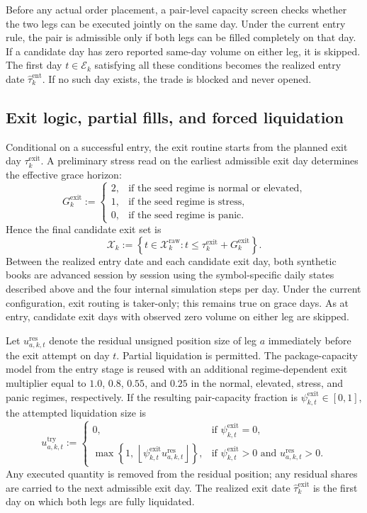\documentclass[11pt,a4paper]{article}
\begin{document}
Before any actual order placement, a pair-level capacity screen checks whether
the two legs can be executed jointly on the same day. Under the current entry
rule, the pair is admissible only if both legs can be filled completely on that
day. If a candidate day has zero reported same-day volume on either leg, it is
skipped. The first day \(t\in\mathcal E_k\) satisfying all these conditions
becomes the realized entry date \(\widehat\tau_k^{\mathrm{ent}}\). If no such
day exists, the trade is blocked and never opened.

\subsection{Exit logic, partial fills, and forced liquidation}

Conditional on a successful entry, the exit routine starts from the planned exit
day \(\tau_k^{\mathrm{exit}}\). A preliminary stress read on the earliest
admissible exit day determines the effective grace horizon:
\[
  G_k^{\mathrm{exit}}
  :=
  \begin{cases}
    2, & \text{if the seed regime is normal or elevated},\\
    1, & \text{if the seed regime is stress},\\
    0, & \text{if the seed regime is panic}.
  \end{cases}
\]
Hence the final candidate exit set is
\[
  \mathcal X_k
  :=
  \left\{
    t\in\mathcal X_k^{\mathrm{raw}}:
    t\le \tau_k^{\mathrm{exit}} + G_k^{\mathrm{exit}}
  \right\}.
\]
Between the realized entry date and each candidate exit day, both synthetic
books are advanced session by session using the symbol-specific daily states
described above and the four internal simulation steps per day. Under the
current configuration, exit routing is taker-only; this remains true on grace
days. As at entry, candidate exit days with observed zero volume on either leg
are skipped.

Let \(u_{a,k,t}^{\mathrm{res}}\) denote the residual unsigned position size of
leg \(a\) immediately before the exit attempt on day \(t\). Partial liquidation
is permitted. The package-capacity model from the entry stage is reused with an
additional regime-dependent exit multiplier equal to \(1.0\), \(0.8\),
\(0.55\), and \(0.25\) in the normal, elevated, stress, and panic regimes,
respectively. If the resulting pair-capacity fraction is
\(\psi_{k,t}^{\mathrm{exit}}\in[0,1]\), the attempted liquidation size is
\[
  u_{a,k,t}^{\mathrm{try}}
  :=
  \begin{cases}
    0, & \text{if } \psi_{k,t}^{\mathrm{exit}}=0,\\
    \max\!\left\{
      1,\,
      \left\lfloor
        \psi_{k,t}^{\mathrm{exit}}u_{a,k,t}^{\mathrm{res}}
      \right\rfloor
    \right\},
    & \text{if } \psi_{k,t}^{\mathrm{exit}}>0
      \text{ and } u_{a,k,t}^{\mathrm{res}}>0.
  \end{cases}
\]
Any executed quantity is removed from the residual position; any residual shares
are carried to the next admissible exit day. The realized exit date
\(\widehat\tau_k^{\mathrm{exit}}\) is the first day on which both legs are
fully liquidated.
\end{document}
